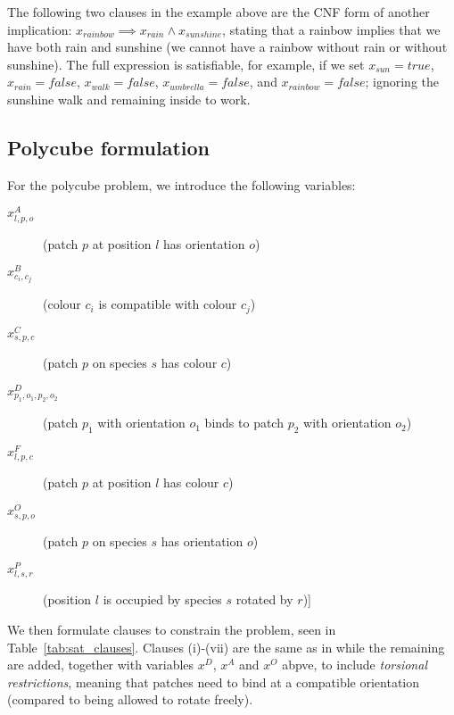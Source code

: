 The following two clauses in the example above are the CNF form of another implication: \(x_{rainbow} \implies  x_{rain} \land x_{sunshine}\), stating that a rainbow implies that we have both rain and sunshine (we cannot have a rainbow without rain or without sunshine). The full expression is satisfiable, for example, if we set \(x_{sun}=true\), \(x_{rain}=false\), \(x_{walk}=false\), \(x_{umbrella}=false\), and \(x_{rainbow}=false\); ignoring the sunshine walk and remaining inside to work.

\subsection{Polycube formulation}

For the polycube problem, we introduce the following variables:
\begin{description}
    \item[\(x_{l,p,o}^{A}\)] (patch \(p\) at position \(l\) has orientation \(o\))
    \item[\(x_{c_i,c_j}^{B}\)] (colour \(c_i\) is compatible with colour \(c_j\))
    \item[\(x_{s,p,c}^{C}\)] (patch \(p\) on species \(s\) has colour \(c\))
    \item[\(x_{p_1,o_1,p_2,o_2}^{D}\)] (patch \(p_1\) with orientation \(o_1\) binds to patch \(p_2\) with orientation \(o_2\))
    \item[\(x_{l,p,c}^{F}\)] (patch \(p\) at position \(l\) has colour \(c\))
    \item[\(x_{s,p,o}^{O}\)] (patch \(p\) on species \(s\) has orientation \(o\))
    \item[\(x_{l,s,r}^{P}\)] (position \(l\) is occupied by species \(s\) rotated by \(r\))] 
\end{description}

We then formulate clauses to constrain the problem, seen in Table~\ref{tab:sat_clauses}. Clauses (i)-(vii) are the same as in \cite{romano2020designing} while the remaining are added, together with variables \(x^D\), \(x^A\) and \(x^O\) abpve, to include \emph{torsional restrictions}, meaning that patches need to bind at a compatible orientation (compared to being allowed to rotate freely).

